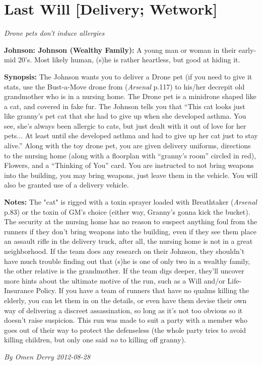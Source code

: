 \documentclass[letterpaper,twocolumn,10.5pt]{article}
\newenvironment{scenario}[6]
	{
		\section{#1 {\small[#2]}}
		\textit{#3}
		\def\TMPSCENARIO{#4 #5}
	}
	{\small\textit{By \TMPSCENARIO}}
\newcommand{\johnson}[2]{\textbf{Johnson: #1 (#2):}}
\newcommand{\synopsis}{\textbf{Synopsis: }}
\newcommand{\notes}{\textbf{Notes: }}
\begin{document}
\begin{scenario}{Last Will}
	{Delivery; Wetwork}
	{ Drone pets don't induce allergies}
	{Omen Derry}
	{2012-08-28}
	{https://forum.rpg.net/showthread.php?321504-Shadowrun-4th-101-Instant-Scenarios\&p=15834341#post15834341}

\johnson{Johnson}{Wealthy Family}  A young man or woman in their early-mid 20's. Most likely human, (s)he is rather heartless, but good at hiding it.

\synopsis The Johnson wants you to deliver a Drone pet (if you need to give it stats, use the Bust-a-Move drone from (\textit{Arsenal} p.117) to his/her decrepit old grandmother who is in a nursing home. The Drone pet is a minidrone shaped like a cat, and covered in fake fur. The Johnson tells you that ``This cat looks just like granny's pet cat that she had to give up when she developed asthma. You see, she's always been allergic to cats, but just dealt with it out of love for her pets... At least until she developed asthma and had to give up her cat just to stay alive.'' Along with the toy drone pet, you are given delivery uniforms, directions to the nursing home (along with a floorplan with ``granny's room'' circled in red), Flowers, and a ``Thinking of You'' card. You are instructed to not bring weapons into the building, you may bring weapons, just leave them in the vehicle. You will also be granted use of a delivery vehicle.

\notes 
    The "cat" is rigged with a toxin sprayer loaded with Breathtaker (\textit{Arsenal} p.83) or the toxin of GM's choice (either way, Granny's gonna kick the bucket). The security at the nursing home has no reason to suspect anything foul from the runners if they don't bring weapons into the building, even if they see them place an assault rifle in the delivery truck, after all, the nursing home is not in a great neighborhood. If the team does any research on their Johnson, they shouldn't have much trouble finding out that (s)he is one of only two in a wealthy family, the other relative is the grandmother. If the team digs deeper, they'll uncover more hints about the ultimate motive of the run, such as a Will and/or Life-Insurance Policy. If you have a team of runners that have no qualms killing the elderly, you can let them in on the details, or even have them devise their own way of delivering a discreet assassination, so long as it's not too obvious so it doesn't raise suspicion. This run was made to suit a party with a member who goes out of their way to protect the defenseless (the whole party tries to avoid killing children, but only one said \textit{no} to killing off granny). 


\end{scenario}
\end{document}
